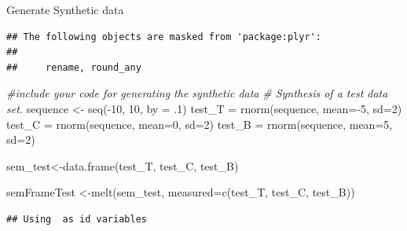 \documentclass[
  ignorenonframetext,
]{beamer}
\newenvironment{Shaded}{\begin{snugshade}}{\end{snugshade}}
\newcommand{\AttributeTok}[1]{\textcolor[rgb]{0.77,0.63,0.00}{#1}}
\newcommand{\CommentTok}[1]{\textcolor[rgb]{0.56,0.35,0.01}{\textit{#1}}}
\newcommand{\DecValTok}[1]{\textcolor[rgb]{0.00,0.00,0.81}{#1}}
\newcommand{\FunctionTok}[1]{\textcolor[rgb]{0.00,0.00,0.00}{#1}}
\newcommand{\NormalTok}[1]{#1}
\newcommand{\OtherTok}[1]{\textcolor[rgb]{0.56,0.35,0.01}{#1}}
\newcommand{\SpecialCharTok}[1]{\textcolor[rgb]{0.00,0.00,0.00}{#1}}
\newcommand{\StringTok}[1]{\textcolor[rgb]{0.31,0.60,0.02}{#1}}
\begin{document}
\begin{frame}[fragile]{Generate Synthetic data}
\begin{verbatim}
## The following objects are masked from 'package:plyr':
## 
##     rename, round_any
\end{verbatim}

\begin{Shaded}
\begin{Highlighting}[]
\CommentTok{\#include your code for generating the synthetic data}
\CommentTok{\# Synthesis of a test data set.}
\NormalTok{sequence }\OtherTok{\textless{}{-}} \FunctionTok{seq}\NormalTok{(}\SpecialCharTok{{-}}\DecValTok{10}\NormalTok{, }\DecValTok{10}\NormalTok{, }\AttributeTok{by =}\NormalTok{ .}\DecValTok{1}\NormalTok{)}
\NormalTok{test\_T }\OtherTok{=} \FunctionTok{rnorm}\NormalTok{(sequence, }\AttributeTok{mean=}\SpecialCharTok{{-}}\DecValTok{5}\NormalTok{, }\AttributeTok{sd=}\DecValTok{2}\NormalTok{)}
\NormalTok{test\_C }\OtherTok{=} \FunctionTok{rnorm}\NormalTok{(sequence, }\AttributeTok{mean=}\DecValTok{0}\NormalTok{, }\AttributeTok{sd=}\DecValTok{2}\NormalTok{)}
\NormalTok{test\_B }\OtherTok{=} \FunctionTok{rnorm}\NormalTok{(sequence, }\AttributeTok{mean=}\DecValTok{5}\NormalTok{, }\AttributeTok{sd=}\DecValTok{2}\NormalTok{)}

\NormalTok{sem\_test}\OtherTok{\textless{}{-}}\FunctionTok{data.frame}\NormalTok{(test\_T, test\_C, test\_B)}

\NormalTok{semFrameTest }\OtherTok{\textless{}{-}}\FunctionTok{melt}\NormalTok{(sem\_test, }\AttributeTok{measured=}\FunctionTok{c}\NormalTok{(test\_T, test\_C, test\_B))}
\end{Highlighting}
\end{Shaded}

\begin{verbatim}
## Using  as id variables
\end{verbatim}

\begin{Shaded}
\end{Shaded}
\end{frame}
\end{document}
